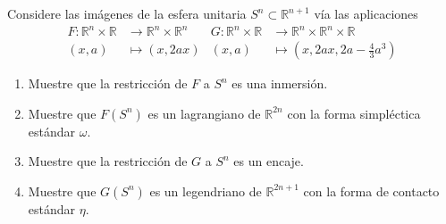\begin{problem}
Considere las imágenes de la esfera unitaria $S^n \subset \mathbb R^{n+1}$ vía las aplicaciones
\begin{align*}
    F : \mathbb R^n \times \mathbb R & \longrightarrow \mathbb R^n \times \mathbb R^n &
    G : \mathbb R^n \times \mathbb R & \longrightarrow \mathbb R^n \times \mathbb R^n \times \mathbb R \\
    (x, a) & \longmapsto (x, 2ax) & (x, a) & \longmapsto (x, 2ax, 2a - \tfrac 43 a^3)
\end{align*}

\begin{enumerate}
    \item Muestre que la restricción de $F$ a $S^n$ es una inmersión.
    \item Muestre que $F(S^n)$ es un lagrangiano de $\mathbb R^{2n}$ con la forma simpléctica estándar $\omega$.
    \item Muestre que la restricción de $G$ a $S^n$ es un encaje.
    \item Muestre que $G(S^n)$ es un legendriano de $\mathbb R^{2n+1}$ con la forma de contacto estándar $\eta$.
\end{enumerate}
\end{problem}

